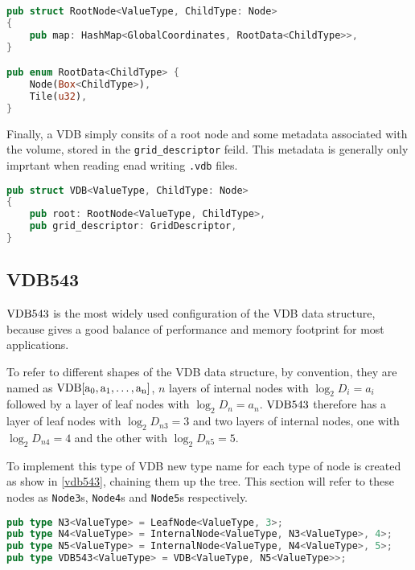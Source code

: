 \begin{lstlisting}[language=rust, captionpos=b, caption={
    \texttt{RootNode} definition. \texttt{RootData} is either a pointer to a child or a 4 bytes of data for a tile value.
  },label={code:root}]
pub struct RootNode<ValueType, ChildType: Node>
{
    pub map: HashMap<GlobalCoordinates, RootData<ChildType>>,
}

pub enum RootData<ChildType> {
    Node(Box<ChildType>),
    Tile(u32),
}
\end{lstlisting}

Finally, a VDB simply consits of a root node and some metadata associated with the volume, stored in the \verb|grid_descriptor| feild. This metadata is generally only imprtant when reading enad writing \verb|.vdb| files.

\begin{lstlisting}[language=rust, captionpos=b, caption={\texttt{VDB} definition}, label={vdb:def}]
pub struct VDB<ValueType, ChildType: Node>
{
    pub root: RootNode<ValueType, ChildType>,
    pub grid_descriptor: GridDescriptor,
}
\end{lstlisting}

\subsection{VDB543}
$\rm{VDB}543$ is the most widely used configuration of the VDB data structure, because gives a good balance of performance and memory footprint for most applications.
\begin{sloppypar}
  To refer to different shapes of the VDB data structure, by convention, they are named as ${\rm{VDB}[a_{0},a_{1},\dots, a_{n}]}$, $n$ layers of internal nodes with $\log_{2}D_{i}=a_{i}$ followed by a layer of leaf nodes with $\log_{2}D_{n}=a_{n}$. $\rm{VDB}543$ therefore has a layer of leaf nodes with $\log_{2}D_{n3} = 3$ and two layers of internal nodes, one with $\log_{2}D_{n4} = 4$ and the other with $\log_{2}D_{n5} = 5$.
\end{sloppypar}

To implement this type of VDB new type name for each type of node is created as show in \cref{vdb543}, chaining them up the tree. This section will refer to these nodes as \texttt{Node3}s, \texttt{Node4}s and \texttt{Node5}s respectively.

\begin{lstlisting}[language=rust, captionpos=b, caption={\texttt{VDB543} definition}, label={vdb543}]
pub type N3<ValueType> = LeafNode<ValueType, 3>;
pub type N4<ValueType> = InternalNode<ValueType, N3<ValueType>, 4>;
pub type N5<ValueType> = InternalNode<ValueType, N4<ValueType>, 5>;
pub type VDB543<ValueType> = VDB<ValueType, N5<ValueType>>;
\end{lstlisting}

